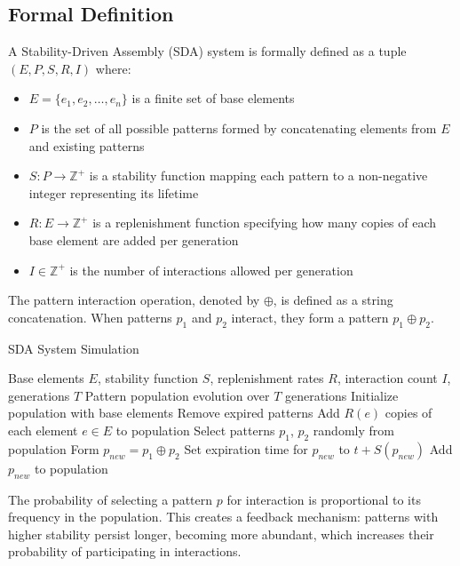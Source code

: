 \documentclass[preprint,12pt]{elsarticle}
\begin{document}
\subsection{Formal Definition}

A Stability-Driven Assembly (SDA) system is formally defined as a tuple $(E, P, S, R, I)$ where:
\begin{itemize}
   \item $E = \{e_1, e_2, \ldots, e_n\}$ is a finite set of base elements
   \item $P$ is the set of all possible patterns formed by concatenating elements from $E$ and existing patterns
   \item $S: P \rightarrow \mathbb{Z}^{+}$ is a stability function mapping each pattern to a non-negative integer representing its lifetime
   \item $R: E \rightarrow \mathbb{Z}^{+}$ is a replenishment function specifying how many copies of each base element are added per generation
   \item $I \in \mathbb{Z}^{+}$ is the number of interactions allowed per generation
\end{itemize}

The pattern interaction operation, denoted by $\oplus$, is defined as a string concatenation. When patterns $p_1$ and $p_2$ interact, they form a pattern $p_1 \oplus p_2$.

\begin{algorithm}[H]
\caption{SDA System Simulation}
\footnotesize
\begin{algorithmic}[1]
\REQUIRE Base elements $E$, stability function $S$, replenishment rates $R$, interaction count $I$, generations $T$
\ENSURE Pattern population evolution over $T$ generations
\STATE Initialize population with base elements
   \STATE Remove expired patterns
   \STATE Add $R(e)$ copies of each element $e \in E$ to population
       \STATE Select patterns $p_1$, $p_2$ randomly from population
       \STATE Form $p_{new} = p_1 \oplus p_2$
       \STATE Set expiration time for $p_{new}$ to $t + S(p_{new})$
       \STATE Add $p_{new}$ to population
   \ENDFOR
\ENDFOR
\end{algorithmic}
\end{algorithm}

The probability of selecting a pattern $p$ for interaction is proportional to its frequency in the population. This creates a feedback mechanism: patterns with higher stability persist longer, becoming more abundant, which increases their probability of participating in interactions.
\end{document}
